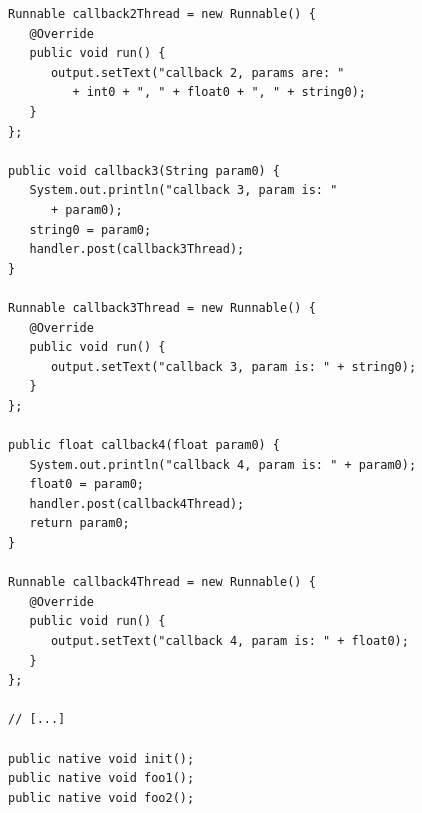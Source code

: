 \documentclass[a4paper,10pt]{article}
\begin{document}
\begin{multicols}{2}
\begin{lstlisting}
Runnable callback2Thread = new Runnable() {
   @Override
   public void run() {
      output.setText("callback 2, params are: "
         + int0 + ", " + float0 + ", " + string0);
   }
};

public void callback3(String param0) {
   System.out.println("callback 3, param is: "
      + param0);
   string0 = param0;
   handler.post(callback3Thread);
}

Runnable callback3Thread = new Runnable() {
   @Override
   public void run() {
      output.setText("callback 3, param is: " + string0);
   }
};

public float callback4(float param0) {
   System.out.println("callback 4, param is: " + param0);
   float0 = param0;
   handler.post(callback4Thread);
   return param0;
}

Runnable callback4Thread = new Runnable() {
   @Override
   public void run() {
      output.setText("callback 4, param is: " + float0);
   }
};

// [...]

public native void init();
public native void foo1();
public native void foo2();


\end{lstlisting}
\end{multicols}
\end{document}
